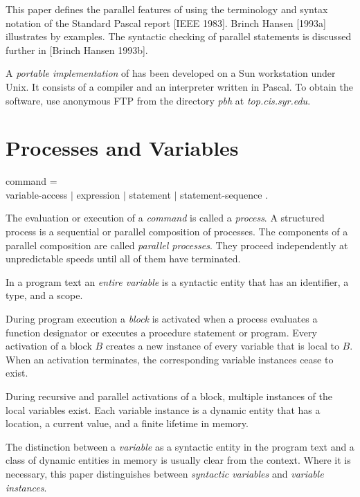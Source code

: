 This paper defines the parallel features of {\Superpascal}
using the terminology and syntax notation of the Standard
Pascal report [IEEE 1983]. Brinch Hansen [1993a]
illustrates {\Superpascal} by examples. The syntactic
checking of parallel statements is discussed further in
[Brinch Hansen 1993b].

A {\it portable implementation} of {\Superpascal} has been
developed on a Sun workstation under Unix. It consists of
a compiler and an interpreter written in Pascal. To obtain
the {\Superpascal} software, use anonymous FTP from the
directory {\it pbh} at {\it top.cis.syr.edu}.


\section{Processes and Variables}

\begin{grammar}
  {\GA}command =                           \\
    {\GB}variable-access $|$ expression $|$
         statement $|$ statement-sequence .
\end{grammar}

The evaluation or execution of a {\it command} is called a
{\it process}. A structured process is a sequential or
parallel composition of processes. The components of a
parallel composition are called {\it parallel processes}.
They proceed independently at unpredictable speeds until all
of them have terminated.

In a program text an {\it entire variable} is a syntactic
entity that has an identifier, a type, and a scope.

During program execution a {\it block} is activated when a
process evaluates a function designator or executes a
procedure statement or program. Every activation of a block
$B$ creates a new instance of every variable that is local
to $B$. When an activation terminates, the corresponding
variable instances cease to exist.

During recursive and parallel activations of a block,
multiple instances of the local variables exist. Each
variable instance is a dynamic entity that has a location, a
current value, and a finite lifetime in memory.

The distinction between a {\it variable} as a syntactic
entity in the program text and a class of dynamic entities
in memory is usually clear from the context. Where it is
necessary, this paper distinguishes between {\it syntactic
variables} and {\it variable instances}.

